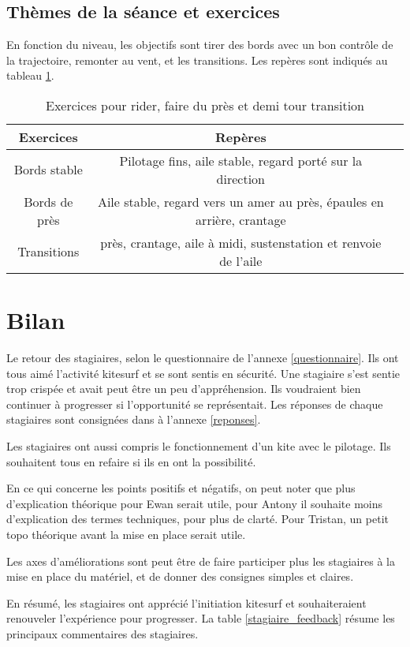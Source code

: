\documentclass[11pt,a4paper]{report}
\begin{document}
\subsection{Thèmes de la séance et exercices}
En fonction du niveau, les objectifs sont tirer des bords avec un bon contrôle de la 
trajectoire, remonter au vent, et les transitions. Les repères sont indiqués
au tableau \ref{seance_pilotage2}.

\begin{table}[h]
\begin{tabular}{|c|c|c|}
\hline
\textbf{Exercices}     &  \textbf{Repères}      \\
\hline 
Bords stable & Pilotage fins, aile stable, regard porté sur la direction   \\
\hline
Bords de près  & Aile stable, regard vers un amer au près, épaules en arrière, crantage  \\
\hline 
Transitions & près, crantage, aile à midi, sustenstation et renvoie de l'aile \\
\hline
\end{tabular}
\caption{Exercices pour rider, faire du près et demi tour transition\label{seance_pilotage2}}
\end{table}
\section{Bilan}
Le retour des stagiaires, selon le questionnaire de l'annexe \ref{questionnaire}.
Ils ont tous aimé l'activité kitesurf et se sont sentis en sécurité.
Une stagiaire s'est sentie trop crispée et avait peut \^etre un peu d'appréhension.
Ils  voudraient bien continuer à progresser si l'opportunité se représentait.
Les réponses de chaque stagiaires sont consignées dans à l'annexe \ref{reponses}.

Les stagiaires ont aussi compris le fonctionnement d'un kite avec le pilotage.
Ils souhaitent tous en refaire si ils en ont la possibilité.

En ce qui concerne les points positifs et négatifs, on peut noter
que plus d'explication théorique pour Ewan serait utile, pour Antony
il souhaite moins d'explication des termes techniques, pour plus de clarté.
Pour Tristan, un petit topo théorique avant la mise en place serait utile.

Les axes d'améliorations sont peut \^etre de faire participer
plus les stagiaires à la mise en place du matériel, et de
donner des consignes simples et claires. 

En résumé, les stagiaires ont apprécié l'initiation kitesurf et
souhaiteraient renouveler l'expérience pour progresser. La table
\ref{stagiaire_feedback} résume les principaux commentaires des stagiaires.
\end{document}
